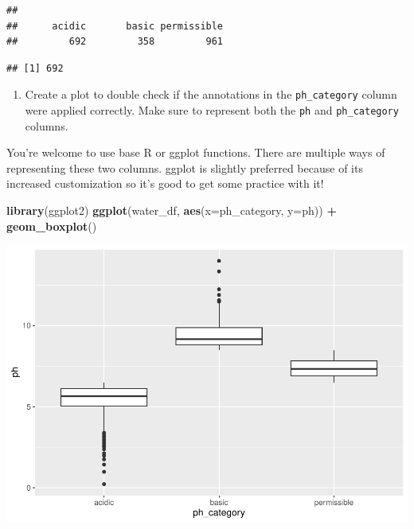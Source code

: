 \documentclass[
]{book}
\newenvironment{Shaded}{\begin{snugshade}}{\end{snugshade}}
\newcommand{\AttributeTok}[1]{\textcolor[rgb]{0.13,0.29,0.53}{#1}}
\newcommand{\FloatTok}[1]{\textcolor[rgb]{0.00,0.00,0.81}{#1}}
\newcommand{\FunctionTok}[1]{\textcolor[rgb]{0.13,0.29,0.53}{\textbf{#1}}}
\newcommand{\NormalTok}[1]{#1}
\newcommand{\SpecialCharTok}[1]{\textcolor[rgb]{0.81,0.36,0.00}{\textbf{#1}}}
\providecommand{\tightlist}{%
  \setlength{\itemsep}{0pt}\setlength{\parskip}{0pt}}
\begin{document}
\begin{verbatim}
## 
##      acidic       basic permissible 
##         692         358         961
\end{verbatim}

\begin{Shaded}
\end{Shaded}

\begin{verbatim}
## [1] 692
\end{verbatim}

\begin{enumerate}
\def\labelenumi{\arabic{enumi}.}
\setcounter{enumi}{4}
\tightlist
\item
  Create a plot to double check if the annotations in the \texttt{ph\_category} column were applied correctly. Make sure to represent both the \texttt{ph} and \texttt{ph\_category} columns.
\end{enumerate}

You're welcome to use base R or ggplot functions. There are multiple ways of representing these two columns. ggplot is slightly preferred because of its increased customization so it's good to get some practice with it!

\begin{Shaded}
\begin{Highlighting}[]
\FunctionTok{library}\NormalTok{(ggplot2)}
\FunctionTok{ggplot}\NormalTok{(water\_df, }\FunctionTok{aes}\NormalTok{(}\AttributeTok{x=}\NormalTok{ph\_category, }\AttributeTok{y=}\NormalTok{ph)) }\SpecialCharTok{+} 
  \FunctionTok{geom\_boxplot}\NormalTok{()}
\end{Highlighting}
\end{Shaded}

\includegraphics{_main_files/figure-latex/unnamed-chunk-63-1.pdf}
\end{document}
